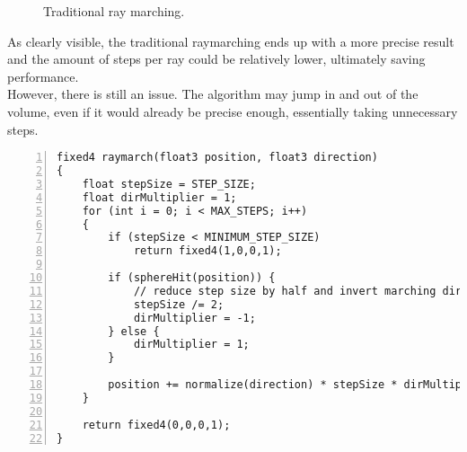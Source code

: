 \begin{figure}[H]
    \centering
    \caption{Traditional ray marching.}
\end{figure}

\noindent
As clearly visible, the traditional \gls{raymarching} ends up with a more precise result and the amount of steps per ray could be relatively lower, ultimately saving performance. 
\\
However, there is still an issue. The algorithm may jump in and out of the volume, even if it would already be precise enough, essentially taking unnecessary steps.

\begin{lstlisting}[language=HLSL, numbers=left, caption=Traditional ray march function with converging surface distance approximation.,captionpos=b, label=lst:shader:raymarch:traditional]
fixed4 raymarch(float3 position, float3 direction)
{
    float stepSize = STEP_SIZE;
    float dirMultiplier = 1;
    for (int i = 0; i < MAX_STEPS; i++)
    {
        if (stepSize < MINIMUM_STEP_SIZE)
            return fixed4(1,0,0,1);

        if (sphereHit(position)) {
            // reduce step size by half and invert marching direction.
            stepSize /= 2;
            dirMultiplier = -1;
        } else {
            dirMultiplier = 1;
        }
        
        position += normalize(direction) * stepSize * dirMultiplier;
    }
    
    return fixed4(0,0,0,1);
}
\end{lstlisting}

